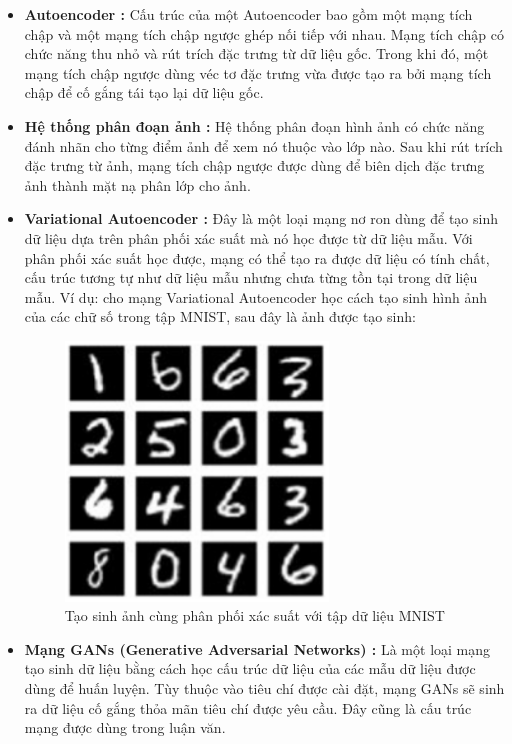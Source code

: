 \begin{itemize}
    \item \textbf{Autoencoder \cite{autoencoder}:} Cấu trúc của một Autoencoder bao gồm một mạng tích chập và một mạng tích chập ngược ghép nối tiếp với nhau. Mạng tích chập có chức năng thu nhỏ và rút trích đặc trưng từ dữ liệu gốc. Trong khi đó, một mạng tích chập ngược dùng véc tơ đặc trưng vừa được tạo ra bởi mạng tích chập để cố gắng tái tạo lại dữ liệu gốc.
    \item \textbf{Hệ thống phân đoạn ảnh \cite{img_segmentation}:} Hệ thống phân đoạn hình ảnh có chức năng đánh nhãn cho từng điểm ảnh để xem nó thuộc vào lớp nào. Sau khi rút trích đặc trưng từ ảnh, mạng tích chập ngược được dùng để biên dịch đặc trưng ảnh thành mặt nạ phân lớp cho ảnh.
    \item \textbf{Variational Autoencoder \cite{vae_base}:} Đây là một loại mạng nơ ron dùng để tạo sinh dữ liệu dựa trên phân phối xác suất mà nó học được từ dữ liệu mẫu. Với phân phối xác suất học được, mạng có thể tạo ra được dữ liệu có tính chất, cấu trúc tương tự như dữ liệu mẫu nhưng chưa từng tồn tại trong dữ liệu mẫu. Ví dụ: cho mạng Variational Autoencoder học cách tạo sinh hình ảnh của các chữ số trong tập MNIST, sau đây là ảnh được tạo sinh: 
        \begin{figure}[H]
            \centering
            \includegraphics[width=7cm]{./content/materials/mnist_vae.png}
            \caption{Tạo sinh ảnh cùng phân phối xác suất với tập dữ liệu MNIST}
        \end{figure}
    \item \textbf{Mạng GANs (Generative Adversarial Networks) \cite{gans_base}:} Là một loại mạng tạo sinh dữ liệu bằng cách học cấu trúc dữ liệu của các mẫu dữ liệu được dùng để huấn luyện. Tùy thuộc vào tiêu chí được cài đặt, mạng GANs sẽ sinh ra dữ liệu cố gắng thỏa mãn tiêu chí được yêu cầu. Đây cũng là cấu trúc mạng được dùng trong luận văn.
\end{itemize}

